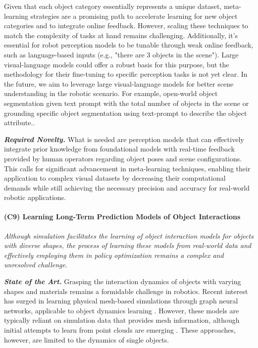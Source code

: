 \documentclass{erc-B2}
\begin{document}
Given that each object category essentially represents a unique dataset, meta-learning strategies \cite{Gao_2022_CVPR,volpp2021bayesian} are a promising path to accelerate learning for new object categories and to integrate online feedback. However, scaling these techniques to match the complexity of tasks at hand remains challenging. Additionally, it's essential for robot perception models to be tunable through weak online feedback, such as language-based inputs (e.g., "there are 3 objects in the scene"). Large visual-language models could offer a robust basis for this purpose, but the methodology for their fine-tuning to specific perception tasks is not yet clear. In the future, we aim to leverage large visual-language models for better scene understanding in the robotic scenario. For example, open-world object segmentation given text prompt with the total number of objects in the scene or grounding specific object segmentation using text-prompt to describe the object attribute..

\textit{\textbf{Required Novelty.}} What is needed are perception models that can effectively integrate prior knowledge from foundational models with real-time feedback provided by human operators regarding object poses and scene configurations. This calls for significant advancement in meta-learning techniques, enabling their application to complex visual datasets by decreasing their computational demands while still achieving the necessary precision and accuracy for real-world robotic applications.

\paragraph{(C9) Learning Long-Term Prediction Models of Object Interactions}
\textit{Although simulation facilitates the learning of object interaction models for objects with diverse shapes, the process of learning these models from real-world data and effectively employing them in policy optimization remains a complex and unresolved challenge.}


\textit{\textbf{State of the Art.}}
Grasping the interaction dynamics of objects with varying shapes and materials remains a formidable challenge in robotics. Recent interest has surged in learning physical mesh-based simulations through graph neural networks, applicable to object dynamics learning \cite{pfaff2021learning}. However, these models are typically reliant on simulation data that provides mesh information, although initial attempts to learn from point clouds are emerging \cite{sundaresan2022diffcloud, linkerhagnerFSM23, shi2023robocook}. These approaches, however, are limited to the dynamics of single objects. 
\end{document}
